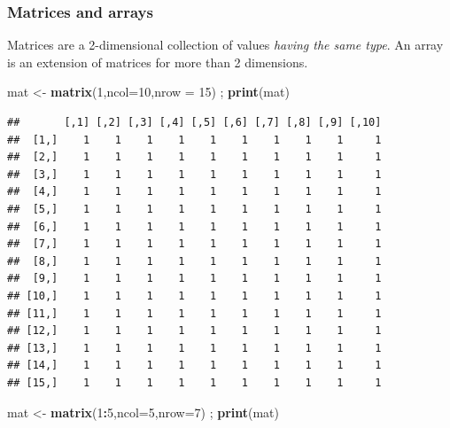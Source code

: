 \documentclass[
]{book}
\newenvironment{Shaded}{\begin{snugshade}}{\end{snugshade}}
\newcommand{\DataTypeTok}[1]{\textcolor[rgb]{0.13,0.29,0.53}{#1}}
\newcommand{\DecValTok}[1]{\textcolor[rgb]{0.00,0.00,0.81}{#1}}
\newcommand{\KeywordTok}[1]{\textcolor[rgb]{0.13,0.29,0.53}{\textbf{#1}}}
\newcommand{\NormalTok}[1]{#1}
\newcommand{\OperatorTok}[1]{\textcolor[rgb]{0.81,0.36,0.00}{\textbf{#1}}}
\newcommand{\StringTok}[1]{\textcolor[rgb]{0.31,0.60,0.02}{#1}}
\begin{document}
\hypertarget{matrices-and-arrays}{%
\subsubsection{Matrices and arrays}\label{matrices-and-arrays}}

Matrices are a 2-dimensional collection of values \emph{having the same type}. An array is an extension of matrices for more than 2 dimensions.

\begin{Shaded}
\begin{Highlighting}[]
\NormalTok{mat <-}\StringTok{ }\KeywordTok{matrix}\NormalTok{(}\DecValTok{1}\NormalTok{,}\DataTypeTok{ncol=}\DecValTok{10}\NormalTok{,}\DataTypeTok{nrow =} \DecValTok{15}\NormalTok{) ; }\KeywordTok{print}\NormalTok{(mat)}
\end{Highlighting}
\end{Shaded}

\begin{verbatim}
##       [,1] [,2] [,3] [,4] [,5] [,6] [,7] [,8] [,9] [,10]
##  [1,]    1    1    1    1    1    1    1    1    1     1
##  [2,]    1    1    1    1    1    1    1    1    1     1
##  [3,]    1    1    1    1    1    1    1    1    1     1
##  [4,]    1    1    1    1    1    1    1    1    1     1
##  [5,]    1    1    1    1    1    1    1    1    1     1
##  [6,]    1    1    1    1    1    1    1    1    1     1
##  [7,]    1    1    1    1    1    1    1    1    1     1
##  [8,]    1    1    1    1    1    1    1    1    1     1
##  [9,]    1    1    1    1    1    1    1    1    1     1
## [10,]    1    1    1    1    1    1    1    1    1     1
## [11,]    1    1    1    1    1    1    1    1    1     1
## [12,]    1    1    1    1    1    1    1    1    1     1
## [13,]    1    1    1    1    1    1    1    1    1     1
## [14,]    1    1    1    1    1    1    1    1    1     1
## [15,]    1    1    1    1    1    1    1    1    1     1
\end{verbatim}

\begin{Shaded}
\begin{Highlighting}[]
\NormalTok{mat <-}\StringTok{ }\KeywordTok{matrix}\NormalTok{(}\DecValTok{1}\OperatorTok{:}\DecValTok{5}\NormalTok{,}\DataTypeTok{ncol=}\DecValTok{5}\NormalTok{,}\DataTypeTok{nrow=}\DecValTok{7}\NormalTok{) ; }\KeywordTok{print}\NormalTok{(mat)}
\end{Highlighting}
\end{Shaded}
\end{document}
